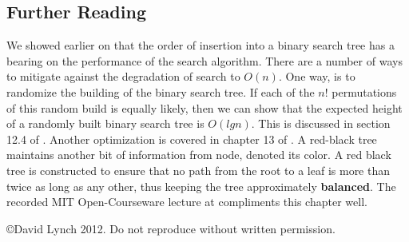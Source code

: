 \documentclass[10pt,a4paper]{article}
\begin{document}
\subsection{Further Reading}
We showed earlier on that the order of insertion into a binary search tree has a bearing on the performance of the search algorithm. There are a number of ways to mitigate against the degradation of search to $O(n)$. One way, is to randomize the building of the binary search tree. If each of the $n!$ permutations of this random build is equally likely, then we can show that the expected height of a randomly built binary search tree is $O(lg n)$. This is discussed in section 12.4 of \cite{INTROALG}. Another optimization is covered in chapter 13 of \cite{INTROALG}. A red-black tree maintains another bit of information from node, denoted its color. A red black tree is constructed to ensure that no path from the root to a leaf is more than twice as long as any other, thus keeping the tree approximately {\bf balanced}. The recorded MIT Open-Courseware lecture at \cite{REDBLACK} compliments this chapter well. 




{}

\begin{center}
{\small \copyright  David Lynch 2012. Do not reproduce without written permission.}
\end{center}
\end{document}
